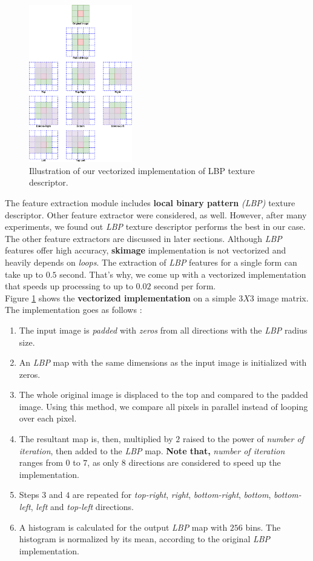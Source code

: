 \begin{figure}[h!]
    \centering
    \includegraphics[width=0.4\textwidth]{images/lbp.png}
    \caption{Illustration of our vectorized implementation of LBP texture descriptor.}
    \label{fig:lbp-implementation}
\end{figure}

The feature extraction module includes \textbf{local binary pattern} \emph{(LBP)} texture descriptor. Other feature extractor were considered, as well. However, after many experiments, we found out \emph{LBP} texture descriptor performs the best in our case. The other feature extractors are discussed in later sections. Although \emph{LBP} features offer high accuracy, \textbf{skimage} implementation is not vectorized and heavily depends on \emph{loops}. The extraction of \emph{LBP} features for a single form can take up to $0.5$ second. That's why, we come up with a vectorized implementation that speeds up processing to up to $0.02$ second per form. \\

Figure \ref{fig:lbp-implementation} shows the \textbf{vectorized implementation} on a simple $3X3$ image matrix. The implementation goes as follows :
\begin{enumerate}
    \item The input image is \emph{padded} with \emph{zeros} from all directions with the \emph{LBP} radius size.
    \item An \emph{LBP} map with the same dimensions as the input image is initialized with zeros.
    \item The whole original image is displaced to the top and compared to the padded image. Using this method, we compare all pixels in parallel instead of looping over each pixel.
    \item The resultant map is, then, multiplied by $2$ raised to the power of \emph{number of iteration}, then added to the \emph{LBP} map. \textbf{Note that,} \emph{number of iteration} ranges from $0$ to $7$, as only $8$ directions are considered to speed up the implementation.
    \item Steps $3$ and $4$ are repeated for \emph{top-right}, \emph{right}, \emph{bottom-right}, \emph{bottom}, \emph{bottom-left}, \emph{left} and \emph{top-left} directions.
    \item A histogram is calculated for the output \emph{LBP} map with $256$ bins. The histogram is normalized by its mean, according to the original \emph{LBP} implementation.
\end{enumerate}
